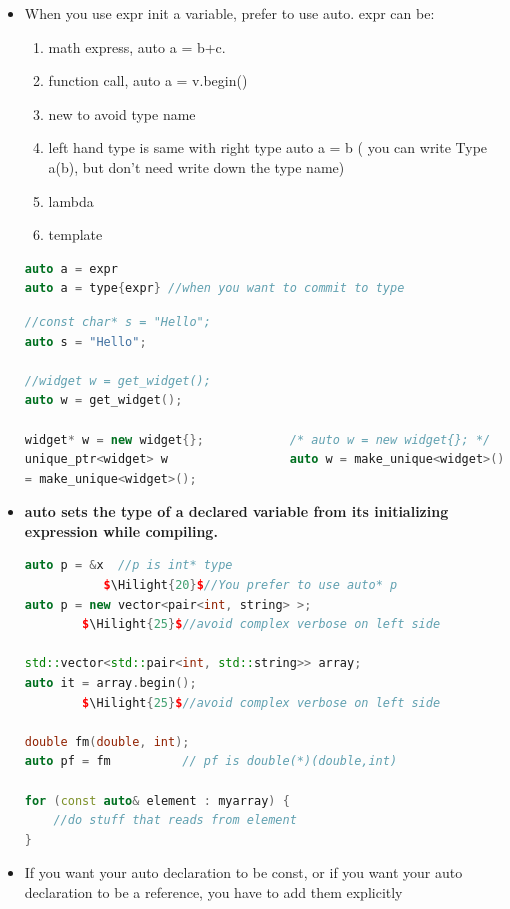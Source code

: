 \documentclass[a4paper,11pt,twoside]{book}
\newcommand{\Hilight}[1]{\makebox[0pt][l]{\color{yellow}\rule[-3pt]{#1em}{11pt}}}
\newcommand{\Hilight}[1]{}
\begin{document}
\begin{itemize}
	\item When you use expr init a variable, prefer to use auto. expr can be:
\begin{enumerate}
	\item math express, auto a = b+c.
	\item function call, auto a = v.begin()
	\item new to avoid type name
	\item left hand type is same with right type auto a = b ( you can write Type a(b), but don't need write down the type name)
	\item lambda
	\item template 
\end{enumerate}
\begin{lstlisting}[frame=single, language=c++]
auto a = expr
auto a = type{expr} //when you want to commit to type
\end{lstlisting}

\begin{lstlisting}[frame=single, language=c++]
//const char* s = "Hello";             
auto s = "Hello";

//widget w = get_widget();             
auto w = get_widget();

widget* w = new widget{};            /* auto w = new widget{}; */
unique_ptr<widget> w                 auto w = make_unique<widget>();
= make_unique<widget>();
\end{lstlisting}

	\item \textbf{auto sets the type of a declared variable from its initializing expression while compiling.}
	
\begin{lstlisting}[frame=single, language=c++]
auto p = &x  //p is int* type
	       $\Hilight{20}$//You prefer to use auto* p
auto p = new vector<pair<int, string> >; 
        $\Hilight{25}$//avoid complex verbose on left side

std::vector<std::pair<int, std::string>> array;
auto it = array.begin();    
        $\Hilight{25}$//avoid complex verbose on left side
	
double fm(double, int);
auto pf = fm          // pf is double(*)(double,int)

for (const auto& element : myarray) {
	//do stuff that reads from element
}
\end{lstlisting}
	
	\item If you want your auto declaration to be const, or if you want your auto declaration to be a reference, you have to add them explicitly
	

\end{itemize}
\end{document}
